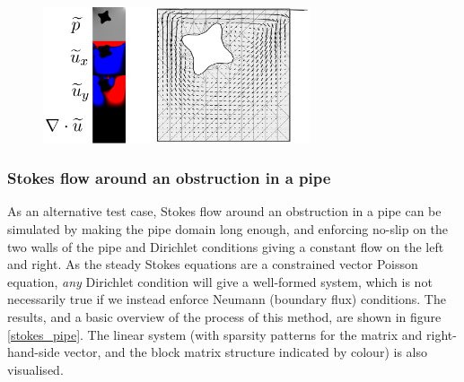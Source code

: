 \begin{figure}[H]
    \centering
    \centerline{\includegraphics[width=0.7\textwidth]{figures/stokes/lid_driven_obstruction/figure.png}}
    \label{stokes_lid_driven_obstruction}
\end{figure}
\newpage
\subsubsection{Stokes flow around an obstruction in a pipe}
As an alternative test case, Stokes flow around an obstruction in a pipe can be simulated by making the pipe domain long enough, and enforcing
no-slip on the two walls of the pipe and Dirichlet conditions giving a constant flow on the left and right. As the steady Stokes equations
are a constrained vector Poisson equation, \textit{any} Dirichlet condition will give a well-formed system, which is not necessarily true
if we instead enforce Neumann (boundary flux) conditions.
The results, and a basic overview of the process of this method, are shown in figure \ref{stokes_pipe}.
The linear system (with sparsity patterns for the matrix and right-hand-side vector, and the block matrix structure indicated by colour) is also visualised.
